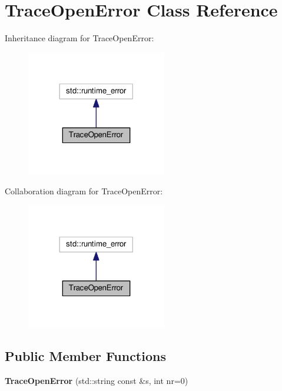 \hypertarget{classTraceOpenError}{}\section{Trace\+Open\+Error Class Reference}
\label{classTraceOpenError}


Inheritance diagram for Trace\+Open\+Error\+:
\nopagebreak
\begin{figure}[H]
\begin{center}
\leavevmode
\includegraphics[width=173pt]{classTraceOpenError__inherit__graph}
\end{center}
\end{figure}


Collaboration diagram for Trace\+Open\+Error\+:
\nopagebreak
\begin{figure}[H]
\begin{center}
\leavevmode
\includegraphics[width=173pt]{classTraceOpenError__coll__graph}
\end{center}
\end{figure}
\subsection*{Public Member Functions}
\begin{DoxyCompactItemize}
\item 
{\bfseries Trace\+Open\+Error} (std\+::string const \&s, int nr=0)\hypertarget{classTraceOpenError_a22262d6be0a9400616618e893dff276e}{}\label{classTraceOpenError_a22262d6be0a9400616618e893dff276e}

\end{DoxyCompactItemize}
